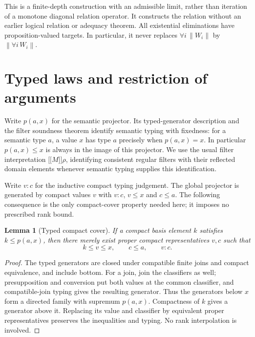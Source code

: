 \documentclass[11pt,a4paper]{article}
\newtheorem{lemma}[theorem]{Lemma}
\theoremstyle{definition}
\theoremstyle{remark}
\newcommand{\ev}[1]{\mathopen{[\![}#1\mathclose{]\!]}}
\newcommand{\trunc}[1]{\left\lVert #1\right\rVert}
\begin{document}
This is a finite-depth construction with an admissible limit, rather than
iteration of a monotone diagonal relation operator. It constructs the
relation without an earlier logical relation or adequacy theorem.
All existential eliminations have proposition-valued targets. In
particular, it never replaces $\forall i\,\trunc{W_i}$ by
$\trunc{\forall i\,W_i}$.

\section{Typed laws and restriction of arguments}

Write $p(a,x)$ for the semantic projector. Its typed-generator description
and the filter soundness theorem identify semantic typing with fixedness:
for a semantic type $a$, a value $x$ has type $a$ precisely when
$p(a,x)=x$. In particular $p(a,x)\leq x$ is always in the image of this
projector. We use the usual filter interpretation $\ev M\rho$, identifying
consistent regular filters with their reflected domain elements whenever
semantic typing supplies this identification.

Write $v:c$ for the inductive compact typing judgement. The global
projector is generated by compact values $v$ with $v:c$, $v\leq x$
and $c\leq a$. The following consequence is the only compact-cover
property needed here; it imposes no prescribed rank bound.

\begin{lemma}[Typed compact cover]\label{lem:typed-cover}
If a compact basis element $k$ satisfies $k\leq p(a,x)$, then there
merely exist proper compact representatives $v,c$ such that
\[
 k\leq v\leq x,\qquad c\leq a,\qquad v:c.
\]
\end{lemma}
\begin{proof}
The typed generators are closed under compatible finite joins and
compact equivalence, and include bottom. For a join, join the classifiers
as well; presupposition and conversion put both values at the common
classifier, and compatible-join typing gives the resulting generator.
Thus the generators below $x$ form a directed family with supremum
$p(a,x)$. Compactness of $k$ gives a generator above it. Replacing its
value and classifier by equivalent proper representatives preserves
the inequalities and typing. No rank interpolation is involved.
\end{proof}
\end{document}
